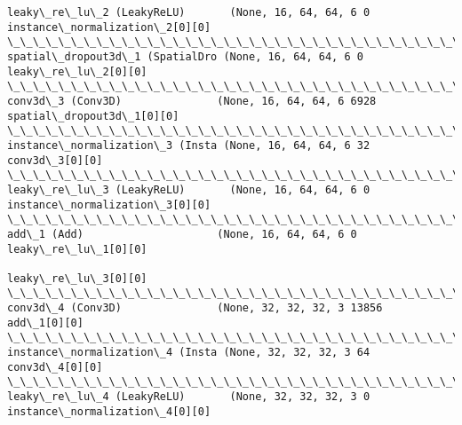 \documentclass[11pt]{article}
\begin{document}
\begin{Verbatim}[commandchars=\\\{\}]
leaky\_re\_lu\_2 (LeakyReLU)       (None, 16, 64, 64, 6 0           instance\_normalization\_2[0][0]   
\_\_\_\_\_\_\_\_\_\_\_\_\_\_\_\_\_\_\_\_\_\_\_\_\_\_\_\_\_\_\_\_\_\_\_\_\_\_\_\_\_\_\_\_\_\_\_\_\_\_\_\_\_\_\_\_\_\_\_\_\_\_\_\_\_\_\_\_\_\_\_\_\_\_\_\_\_\_\_\_\_\_\_\_\_\_\_\_\_\_\_\_\_\_\_\_\_\_
spatial\_dropout3d\_1 (SpatialDro (None, 16, 64, 64, 6 0           leaky\_re\_lu\_2[0][0]              
\_\_\_\_\_\_\_\_\_\_\_\_\_\_\_\_\_\_\_\_\_\_\_\_\_\_\_\_\_\_\_\_\_\_\_\_\_\_\_\_\_\_\_\_\_\_\_\_\_\_\_\_\_\_\_\_\_\_\_\_\_\_\_\_\_\_\_\_\_\_\_\_\_\_\_\_\_\_\_\_\_\_\_\_\_\_\_\_\_\_\_\_\_\_\_\_\_\_
conv3d\_3 (Conv3D)               (None, 16, 64, 64, 6 6928        spatial\_dropout3d\_1[0][0]        
\_\_\_\_\_\_\_\_\_\_\_\_\_\_\_\_\_\_\_\_\_\_\_\_\_\_\_\_\_\_\_\_\_\_\_\_\_\_\_\_\_\_\_\_\_\_\_\_\_\_\_\_\_\_\_\_\_\_\_\_\_\_\_\_\_\_\_\_\_\_\_\_\_\_\_\_\_\_\_\_\_\_\_\_\_\_\_\_\_\_\_\_\_\_\_\_\_\_
instance\_normalization\_3 (Insta (None, 16, 64, 64, 6 32          conv3d\_3[0][0]                   
\_\_\_\_\_\_\_\_\_\_\_\_\_\_\_\_\_\_\_\_\_\_\_\_\_\_\_\_\_\_\_\_\_\_\_\_\_\_\_\_\_\_\_\_\_\_\_\_\_\_\_\_\_\_\_\_\_\_\_\_\_\_\_\_\_\_\_\_\_\_\_\_\_\_\_\_\_\_\_\_\_\_\_\_\_\_\_\_\_\_\_\_\_\_\_\_\_\_
leaky\_re\_lu\_3 (LeakyReLU)       (None, 16, 64, 64, 6 0           instance\_normalization\_3[0][0]   
\_\_\_\_\_\_\_\_\_\_\_\_\_\_\_\_\_\_\_\_\_\_\_\_\_\_\_\_\_\_\_\_\_\_\_\_\_\_\_\_\_\_\_\_\_\_\_\_\_\_\_\_\_\_\_\_\_\_\_\_\_\_\_\_\_\_\_\_\_\_\_\_\_\_\_\_\_\_\_\_\_\_\_\_\_\_\_\_\_\_\_\_\_\_\_\_\_\_
add\_1 (Add)                     (None, 16, 64, 64, 6 0           leaky\_re\_lu\_1[0][0]              
                                                                 leaky\_re\_lu\_3[0][0]              
\_\_\_\_\_\_\_\_\_\_\_\_\_\_\_\_\_\_\_\_\_\_\_\_\_\_\_\_\_\_\_\_\_\_\_\_\_\_\_\_\_\_\_\_\_\_\_\_\_\_\_\_\_\_\_\_\_\_\_\_\_\_\_\_\_\_\_\_\_\_\_\_\_\_\_\_\_\_\_\_\_\_\_\_\_\_\_\_\_\_\_\_\_\_\_\_\_\_
conv3d\_4 (Conv3D)               (None, 32, 32, 32, 3 13856       add\_1[0][0]                      
\_\_\_\_\_\_\_\_\_\_\_\_\_\_\_\_\_\_\_\_\_\_\_\_\_\_\_\_\_\_\_\_\_\_\_\_\_\_\_\_\_\_\_\_\_\_\_\_\_\_\_\_\_\_\_\_\_\_\_\_\_\_\_\_\_\_\_\_\_\_\_\_\_\_\_\_\_\_\_\_\_\_\_\_\_\_\_\_\_\_\_\_\_\_\_\_\_\_
instance\_normalization\_4 (Insta (None, 32, 32, 32, 3 64          conv3d\_4[0][0]                   
\_\_\_\_\_\_\_\_\_\_\_\_\_\_\_\_\_\_\_\_\_\_\_\_\_\_\_\_\_\_\_\_\_\_\_\_\_\_\_\_\_\_\_\_\_\_\_\_\_\_\_\_\_\_\_\_\_\_\_\_\_\_\_\_\_\_\_\_\_\_\_\_\_\_\_\_\_\_\_\_\_\_\_\_\_\_\_\_\_\_\_\_\_\_\_\_\_\_
leaky\_re\_lu\_4 (LeakyReLU)       (None, 32, 32, 32, 3 0           instance\_normalization\_4[0][0]   

\end{Verbatim}
\end{document}
